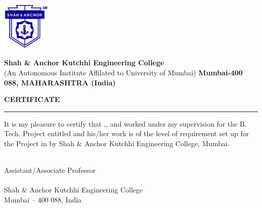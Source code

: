 \thispagestyle{plain}

\begin{minipage}[c]{1mm}
            \includegraphics[width=23mm]{images/SAKEC_logo.png} %
        \end{minipage}
        \hfill
        \begin{minipage}[c]{126mm} %
            \centering
            { \bf \large {Shah \& Anchor Kutchhi Engineering College  } }\\
   \vspace{-0.01 \baselineskip}
    {(An Autonomous Institute Affilated to University of Mumbai) }
    { \bf \small {Mumbai-400 088, MAHARASHTRA (India)   } }\\
               
            
        \end{minipage}

\vspace{0.2\baselineskip}

\begin{center}
{\Large {\bf \uppercase{Certificate}}}
\end{center}
\vspace{\baselineskip}
\hrule
\vspace{2\baselineskip}
\noindent
{It is my pleasure to certify that \textbf{{\studentNamea}},\textbf{{\studentNameb}}, \textbf{{\studentNamec}} and \textbf{{\studentNamed}} worked under my supervision for the B. Tech. Project entitled \textbf{{\mytitle}} and his/her work is of the level of requirement set up for the Project in \textbf{{\branch}}  by Shah \& Anchor Kutchhi Engineering College, Mumbai.}


\bigskip


\bigskip
\noindent{\textbf{\mysupervisor}} \\
Assistant/Associate Professor \\
\mydep \\
Shah \& Anchor Kutchhi Engineering College \\
Mumbai – 400 088, India


